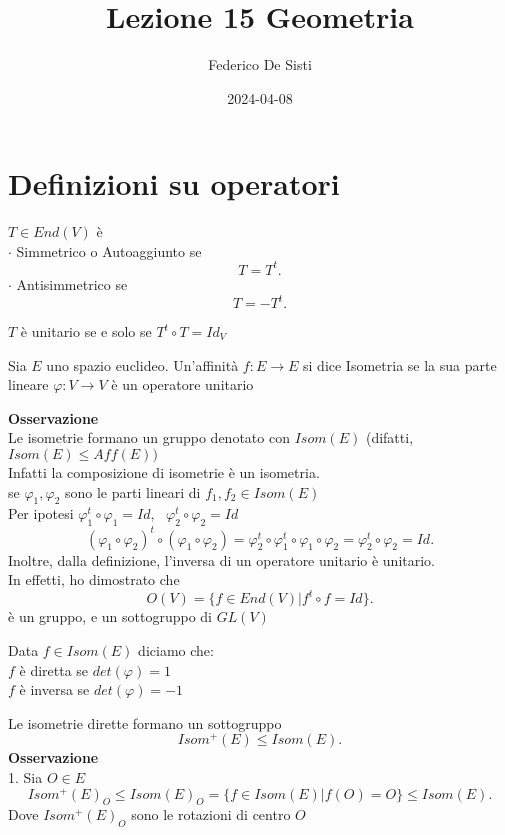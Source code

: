 \documentclass[12px]{article}
\title{Lezione 15 Geometria}
\date{2024-04-08}
\author{Federico De Sisti}
\begin{document}
	\maketitle
	\newpage
	\section{Definizioni su operatori}
	\begin{defi}
		$T\in End(V)$ è \\
		$\cdot$ Simmetrico o Autoaggiunto se
		\[
		T = T^t
		.\] 
		$\cdot$ Antisimmetrico se
		\[
		T = -T^t
		.\] 
	\end{defi}
	\begin{prop}
		$T$ è unitario se e solo se $T^t\circ T = Id_V$
	\end{prop}
	\begin{defi}
		Sia $E$ uno spazio euclideo. Un'affinità $f:E \rightarrow E$ si dice Isometria se la sua parte lineare $\varphi: V \rightarrow V$ è un operatore unitario
	\end{defi}
	\textbf{Osservazione}\\
	Le isometrie formano un gruppo denotato con $Isom(E)$ (difatti, $Isom(E) \leq Aff(E))$\\
	Infatti la composizione di isometrie è un isometria.\\
	se $\varphi_1,\varphi_2$ sono le parti lineari di $f_1,f_2\in Isom(E)$\\
	Per ipotesi $\varphi_1^t\circ \varphi_1 = Id, \ \ \ \varphi_2^t\circ \varphi_2 = Id$ \\
	\[
		(\varphi_1\circ \varphi_2)^t\circ(\varphi_1\circ \varphi_2) = \varphi_2^t\circ \varphi_1^t\circ \varphi_1\circ \varphi_2 = \varphi_2^t\circ \varphi_2 = Id
	.\] 
	Inoltre, dalla definizione, l'inversa di un operatore unitario è unitario.\\
	In effetti, ho dimostrato che 
	\[
		O(V) = \{f\in End(V)|f^t\circ f = Id\}
	.\] 
	è un gruppo, e un sottogruppo di $GL(V)$\\
 \begin{nome}
 	Data $f\in Isom(E)$ diciamo che:\\
	$f$ è diretta se $det(\varphi) = 1$ \\
	$f$ è inversa se $det(\varphi) = -1$
 \end{nome}
 Le isometrie dirette formano un sottogruppo
 \[
 Isom^+(E)\leq Isom(E)
 .\] 
 \textbf{Osservazione}
\\
1. Sia $O\in E$ 
\[
 Isom^+(E)_O\leq Isom(E)_O = \{f\in Isom(E)|f(O) = O\} \leq Isom(E)
.\] 
Dove $Isom^+(E)_O$ sono le rotazioni di centro $O$ \\
\end{document}

